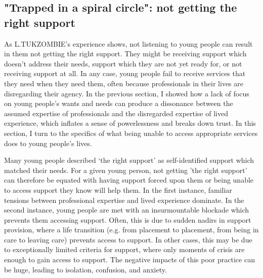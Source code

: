 \subsection{"Trapped in a spiral circle": not getting the right support}
As L.TUKZOMBIE's experience shows, not listening to young people can result in them not getting the right support. They might be receiving support which doesn’t address their needs, support which they are not yet ready for, or not receiving support at all. In any case, young people fail to receive services that they need when they need them, often because professionals in their lives are disregarding their agency. In the previous section, I showed how a lack of focus on young people's wants and needs can produce a dissonance between the assumed expertise of professionals and the disregarded expertise of lived experience, which inflates a sense of powerlessness and breaks down trust. In this section, I turn to the specifics of what being unable to access appropriate services does to young people's lives.

Many young people described ‘the right support' as self-identified support which matched their needs. For a given young person, not getting 'the right support' can therefore be equated with having support forced upon them or being unable to access support they know will help them. In the first instance, familiar tensions between professional expertise and lived experience dominate. In the second instance, young people are met with an insurmountable blockade which prevents them accessing support. Often, this is due to sudden nadirs in support provision, where a life transition (e.g. from placement to placement, from being in care to leaving care) prevents access to support. In other cases, this may be due to exceptionally limited criteria for support, where only moments of crisis are enough to gain access to support. The negative impacts of this poor practice can be huge, leading to isolation, confusion, and anxiety. 

